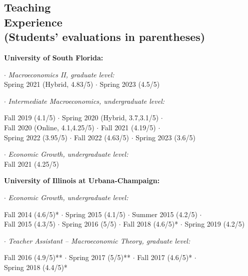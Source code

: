 \documentclass[mm, 10pt]{simple_style}
\begin{document}
\begin{resume}
\section{Teaching\\ Experience \\ {\protect\footnotesize (Students' evaluations in parentheses)}}

\textbf{University of South Florida:}

$\cdot$ \textit{Macroeconomics II, graduate level:} \\
\indent \hspace{1cm} Spring 2021 (Hybrid, 4.83/5) $\cdot$ Spring 2023 (4.5/5)

$\cdot$  \textit{Intermediate Macroeconomics, undergraduate level:}\\
\indent \hspace{1cm}  \begin{minipage}[t]{0.75\textwidth}
Fall 2019 (4.1/5) $\cdot$ Spring 2020 (Hybrid, 3.7,3.1/5) $\cdot$ \\
Fall 2020 (Online, 4.1,4.25/5) $\cdot$ Fall 2021 (4.19/5) $\cdot$ \\
Spring 2022 (3.95/5) $\cdot$ Fall 2022 (4.63/5) $\cdot$ Spring 2023 (3.6/5)
\end{minipage}

$\cdot$  \textit{Economic Growth, undergraduate level:} \\
\indent \hspace{1cm}  Fall 2021 (4.25/5) 

\textbf{University of Illinois at Urbana-Champaign:}

$\cdot$ \textit{Economic Growth, undergraduate level:} \\
\indent \hspace{1cm}  \begin{minipage}[t]{0.8\textwidth}
Fall 2014 (4.6/5)* $\cdot$ Spring 2015 (4.1/5) $\cdot$ Summer 2015 (4.2/5) $\cdot$ \\
Fall 2015 (4.3/5) $\cdot$ Spring 2016 (5/5) $\cdot$ Fall 2018 (4.6/5)* $\cdot$ Spring 2019 (4.2/5)
\end{minipage}

$\cdot$ \textit{Teacher Assistant -- Macroeconomic Theory, graduate level:} \\
\indent \hspace{1cm}  \begin{minipage}[t]{0.75\textwidth}
Fall 2016 (4.9/5)** $\cdot$ Spring 2017 (5/5)** $\cdot$ Fall 2017 (4.6/5)* $\cdot$ \\
Spring 2018 (4.4/5)*
\end{minipage}


\end{resume}
\end{document}
